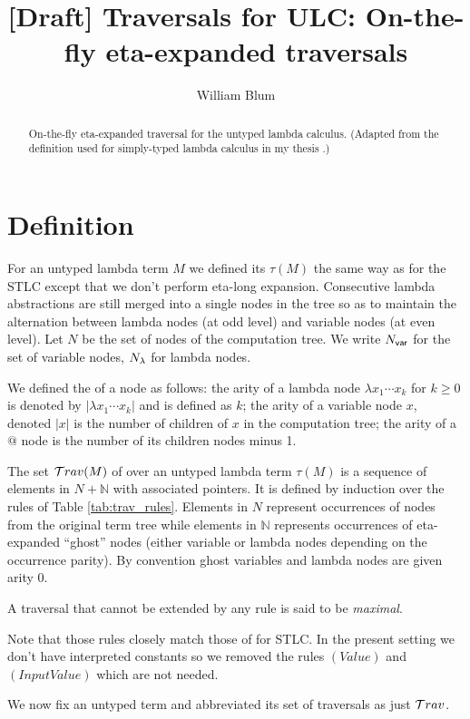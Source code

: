 \documentclass{article}
\author{William Blum}
\title{[Draft] Traversals for ULC: On-the-fly eta-expanded traversals}
\theoremstyle{definition}
\newcommand\Nodes{N}%
\begin{document}
\maketitle
\begin{abstract}
On-the-fly eta-expanded traversal for the untyped lambda calculus.
(Adapted from the definition used for simply-typed lambda calculus in my thesis \cite{BlumPhd}.)
\end{abstract}


\section{Definition}

For an untyped lambda term $M$ we defined its  $\tau(M)$ the same way as for the STLC
except that we don't perform eta-long expansion. Consecutive lambda abstractions are still merged into a single nodes in the tree so as to maintain the alternation between lambda nodes (at odd level) and variable nodes (at even level).
Let $\Nodes$ be the set of nodes of the computation tree. We write $\Nodes_{\sf var}$ for the set of variable nodes, $\Nodes_{\sf \lambda}$ for lambda nodes.

We defined the  of a node as follows: the arity of a lambda node $\lambda x_1 \cdots x_k$ for $k\geq 0$ is denoted by $|\lambda x_1 \cdots x_k|$ and is defined as $k$; the arity of a variable node $x$, denoted $|x|$ is the number of children of $x$ in the computation tree; the arity of a $@$ node is the number of its children nodes minus 1.

The set $\mathcal{T}rav(M)$ of  over an untyped lambda term $\tau(M)$ is a sequence of elements in $N + \mathbb{N}$ with associated pointers. It is defined by induction over the rules of Table \ref{tab:trav_rules}.
Elements in $N$ represent occurrences of nodes from the original term tree while elements in $\mathbb{N}$ represents occurrences of eta-expanded ``ghost'' nodes (either variable or lambda nodes depending on the occurrence parity).
By convention ghost variables and lambda nodes are given arity $0$.

A traversal that cannot be extended by any rule is said to be \emph{maximal}.

Note that those rules closely match those of \cite{BlumPhd} for STLC. In the present setting we don't have interpreted constants so we removed the rules $(Value)$ and $(InputValue)$ which are not needed.

We now fix an untyped term and abbreviated its set of traversals as just $\mathcal{T}rav$.
 
\end{document}
